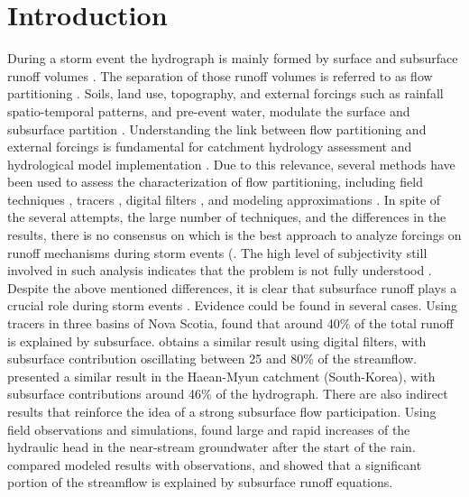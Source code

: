 \documentclass[preprint,12pt]{elsarticle}
\begin{document}
\linenumbers

\section{Introduction}
\label{intro}

During a storm event the hydrograph is mainly formed by surface and subsurface runoff volumes \citep{Flury1994,Jackisch2016}. The separation of those runoff volumes is referred to as flow partitioning \citep{Munoz2012}. Soils, land use, topography, and external forcings such as rainfall spatio-temporal patterns, and pre-event water, modulate the surface and subsurface partition \citep{radatz2013, Shope2016}. Understanding the link between flow partitioning and external forcings is fundamental for catchment hydrology assessment and hydrological model implementation \citep{todd2006,Tetzlaff2008}.  Due to this relevance, several methods have been used to assess the characterization of flow partitioning, including field techniques \citep{Shope2016}, tracers \citep{Tetzlaff2008}, digital filters \citep{Eckhardt2005,Stewart2015a}, and modeling approximations \citep{Partington2011, Dukic2006}.  In spite of the several attempts, the large number of techniques, and the differences in the results, there is no consensus on which is the best approach to analyze forcings on runoff mechanisms during storm events (\citep{Stewart2015a, Blume2015, Penna2015}. The  high level of subjectivity still involved in such analysis indicates that the problem is not fully understood \citep{Dukic2006, Tallaksen1995}.\\

Despite the above mentioned differences, it is clear that subsurface runoff plays a crucial role during storm events \citep{Pinder1969, Sklash1979, Wels1991, Zehe2010,Blume2015, Jackisch2016}.  Evidence could be found in several cases. Using tracers in three basins of Nova Scotia, \citet{Pinder1969} found that around 40\% of the total runoff is explained by subsurface.  \citet{Eckhardt2005} obtains a similar result using digital filters,  with subsurface contribution oscillating between 25 and 80\% of the streamflow.  \citet{Shope2016} presented a similar result in the Haean-Myun catchment (South-Korea), with subsurface contributions around 46\% of the hydrograph.  There are also indirect results that reinforce the idea of a strong subsurface flow participation. Using field observations and simulations,  \citet{Sklash1979} found large and rapid increases of the hydraulic head in the near-stream groundwater after the start of the rain. \citet{Kubota1995} compared modeled results with observations, and showed that a significant portion of the streamflow is explained by subsurface runoff equations.\\ 
\end{document}

